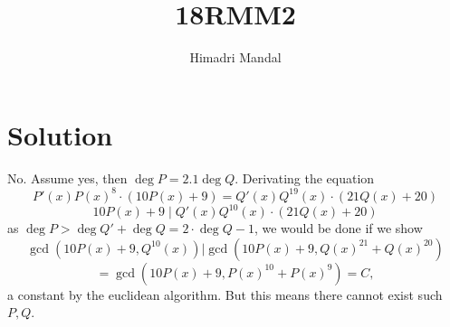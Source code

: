 \documentclass[11pt]{scrartcl}
\title{18RMM2}
\author{Himadri Mandal}
\begin{document}
\maketitle

\section{Solution}
\begin{soln}
No. Assume yes, then $\deg P = 2.1 \deg Q$. Derivating the equation
\[ P'(x)P(x)^8 \cdot (10P(x) + 9) = Q'(x)Q^{19}(x) \cdot (21Q(x) + 20) \]
\[ 10P(x) + 9 \mid Q'(x)Q^{10}(x) \cdot (21Q(x) + 20) \]
as $\deg P > \deg Q' + \deg Q = 2\cdot\deg Q-1$, we would be done if we show
\[\gcd(10P(x) + 9, Q^{10}(x)) | \gcd(10P(x) + 9, Q(x)^{21} + Q(x)^{20}) \]
\[= \gcd(10P(x)+9, P(x)^{10} + P(x)^9) = C,\]
a constant by the euclidean algorithm. But this means there cannot exist
such $P,Q$.
\end{soln}
\end{document}
